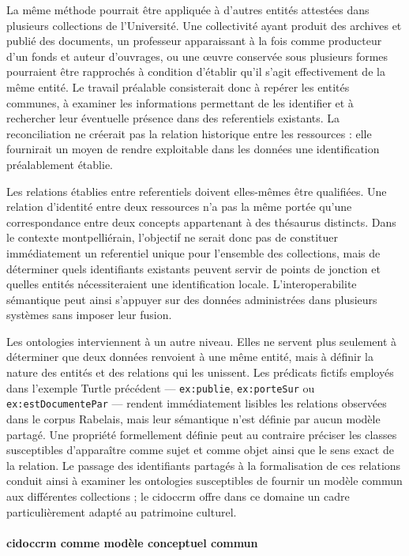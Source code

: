 La même méthode pourrait être appliquée à d'autres entités attestées dans plusieurs collections de l'Université. Une collectivité ayant produit des archives et publié des documents, un professeur apparaissant à la fois comme producteur d'un fonds et auteur d'ouvrages, ou une œuvre conservée sous plusieurs formes pourraient être rapprochés à condition d'établir qu'il s'agit effectivement de la même entité. Le travail préalable consisterait donc à repérer les entités communes, à examiner les informations permettant de les identifier et à rechercher leur éventuelle présence dans des \glspl{referentiel} existants. La \gls{reconciliation} ne créerait pas la relation historique entre les ressources : elle fournirait un moyen de rendre exploitable dans les données une identification préalablement établie.

Les relations établies entre \glspl{referentiel} doivent elles-mêmes être qualifiées. Une relation d'identité entre deux ressources n'a pas la même portée qu'une correspondance entre deux concepts appartenant à des thésaurus distincts. Dans le contexte montpelliérain, l'objectif ne serait donc pas de constituer immédiatement un \gls{referentiel} unique pour l'ensemble des collections, mais de déterminer quels identifiants existants peuvent servir de points de jonction et quelles entités nécessiteraient une identification locale. L'\gls{interoperabilite} sémantique peut ainsi s'appuyer sur des données administrées dans plusieurs systèmes sans imposer leur fusion.

Les \glspl{ontologie} interviennent à un autre niveau. Elles ne servent plus seulement à déterminer que deux données renvoient à une même entité, mais à définir la nature des entités et des relations qui les unissent. Les prédicats fictifs employés dans l'exemple Turtle précédent --- \verb|ex:publie|, \verb|ex:porteSur| ou \verb|ex:estDocumentePar| --- rendent immédiatement lisibles les relations observées dans le corpus Rabelais, mais leur sémantique n'est définie par aucun modèle partagé. Une propriété formellement définie peut au contraire préciser les classes susceptibles d'apparaître comme sujet et comme objet ainsi que le sens exact de la relation. Le passage des identifiants partagés à la formalisation de ces relations conduit ainsi à examiner les \glspl{ontologie} susceptibles de fournir un modèle commun aux différentes collections ; le \gls{cidoccrm} offre dans ce domaine un cadre particulièrement adapté au patrimoine culturel.


\paragraph{\gls{cidoccrm} comme modèle conceptuel commun}

